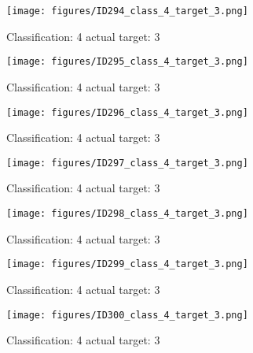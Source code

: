 \begin{figure}[h!]
\begin{center}
\texttt{[image: figures/ID294\_class\_4\_target\_3.png]}
\end{center}
\caption{ Classification: 4 actual target: 3}
\label{fig:ID294_class_4_target_3}
\end{figure}
\begin{figure}[h!]
\begin{center}
\texttt{[image: figures/ID295\_class\_4\_target\_3.png]}
\end{center}
\caption{ Classification: 4 actual target: 3}
\label{fig:ID295_class_4_target_3}
\end{figure}
\begin{figure}[h!]
\begin{center}
\texttt{[image: figures/ID296\_class\_4\_target\_3.png]}
\end{center}
\caption{ Classification: 4 actual target: 3}
\label{fig:ID296_class_4_target_3}
\end{figure}
\begin{figure}[h!]
\begin{center}
\texttt{[image: figures/ID297\_class\_4\_target\_3.png]}
\end{center}
\caption{ Classification: 4 actual target: 3}
\label{fig:ID297_class_4_target_3}
\end{figure}
\begin{figure}[h!]
\begin{center}
\texttt{[image: figures/ID298\_class\_4\_target\_3.png]}
\end{center}
\caption{ Classification: 4 actual target: 3}
\label{fig:ID298_class_4_target_3}
\end{figure}
\begin{figure}[h!]
\begin{center}
\texttt{[image: figures/ID299\_class\_4\_target\_3.png]}
\end{center}
\caption{ Classification: 4 actual target: 3}
\label{fig:ID299_class_4_target_3}
\end{figure}
\begin{figure}[h!]
\begin{center}
\texttt{[image: figures/ID300\_class\_4\_target\_3.png]}
\end{center}
\caption{ Classification: 4 actual target: 3}
\label{fig:ID300_class_4_target_3}
\end{figure}
